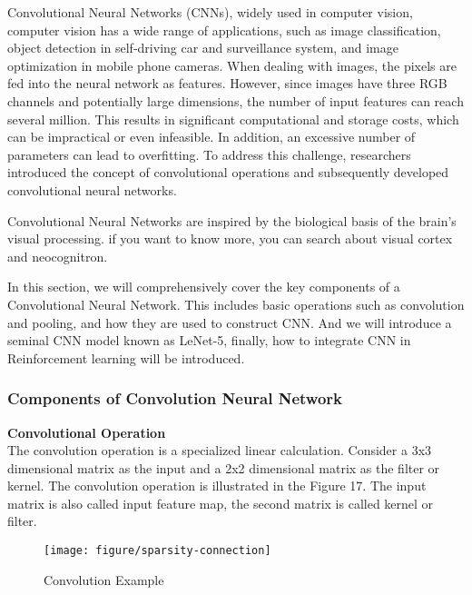 \documentclass{article}
\begin{document}
    Convolutional Neural Networks (CNNs), widely used in computer vision, computer vision has a wide range of applications, such as image classification, object detection in self-driving car and surveillance system, and image optimization in mobile phone cameras. When dealing with images, the pixels are fed into the neural network as features. However, since images have three RGB channels and potentially large dimensions, the number of input features can reach several million. This results in significant computational and storage costs, which can be impractical or even infeasible. In addition, an excessive number of parameters can lead to overfitting. To address this challenge, researchers introduced the concept of convolutional operations and subsequently developed convolutional neural networks.

Convolutional Neural Networks are inspired by the biological basis of the brain's visual processing.  if you want to know more, you can search about visual cortex and neocognitron.

In this section, we will comprehensively cover the key components of a Convolutional Neural Network. This includes basic operations such as convolution and pooling, and how they are used to construct CNN. And we will introduce a seminal CNN model known as LeNet-5, finally, how to integrate CNN in Reinforcement learning will be introduced.



\newpage
\subsubsection{Components of Convolution Neural Network}


\textbf{Convolutional Operation}\\
\noindent
The convolution operation is a specialized linear calculation. Consider a 3x3 dimensional matrix as the input and a 2x2 dimensional matrix as the filter or kernel. The convolution operation is illustrated in the Figure 17. The input matrix is also called input feature map, the second matrix is called kernel or filter.

\begin{figure}[htbp]
        \centering
        \texttt{[image: figure/sparsity-connection]}
        \caption{Convolution Example}
     \end{figure}
\end{document}
